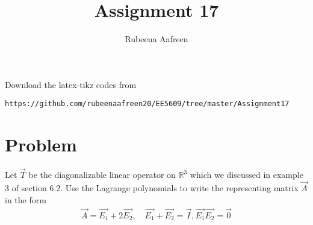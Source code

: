 \documentclass[journal,12pt]{IEEEtran}
\begin{document}
     \def\rightbox#1{\makebox[0in][r]{#1}}
     \def\centbox#1{\makebox[0in]{#1}}
     \def\topbox#1{\raisebox{-\baselineskip}[0in][0in]{#1}}
     \def\midbox#1{\raisebox{-0.5\baselineskip}[0in][0in]{#1}}
\vspace{3cm}
\title{Assignment 17}
\author{Rubeena Aafreen}
\maketitle
\bigskip
\renewcommand{\thefigure}{\theenumi}
\renewcommand{\thetable}{\theenumi}
%
Download the latex-tikz codes from 
%
\begin{lstlisting}
https://github.com/rubeenaafreen20/EE5609/tree/master/Assignment17
\end{lstlisting}
\section{\textbf{Problem}}
%
Let $\vec{T}$ be the diagonalizable linear operator on $\mathbb{R}^3$ which we discussed in example 3 of section $6.2$. Use the Lagrange polynomials to write the representing matrix $\vec{A}$ in the form
\begin{align}
    \vec{A}=\vec{E_1}+2\vec{E_2},\quad \vec{E_1}+\vec{E_2}=\vec{I}, \vec{E_1}\vec{E_2}=\vec{0}
\end{align}
\end{document}
